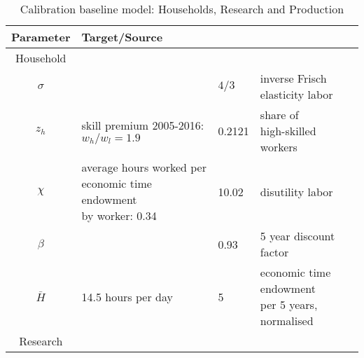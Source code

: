  \begin{table}[h!]
 	\begin{center}
 		\captionsetup{width=0.9\textwidth}
 		\caption{ Calibration baseline model: Households, Research and Production}
 		\label{tab:calib}
 		\begin{tabular}{c|lll}
 			\hline \hline
 			Parameter& Target/Source& \makecell[l]{Calibration}& \makecell[l]{Meaning}\\ 
 			\hline
 			\hline
 			Household&\multicolumn{3}{c}{}\\
 			\hline 
 			
 			\hline
 			$\sigma$ &  \makecell[l]{\cite{Chetty2011AreMargins}}& $4/3$ & inverse Frisch elasticity labor  \\
 			\hline
 			$z_h$& \makecell[l]{skill premium 2005-2016:\\ $w_h/w_l=1.9$\\ \citep{Slavik2020WagePremium}}&0.2121&\makecell[l]{share of\\ high-skilled workers} \\	
 			\hline			
 			$\chi$ &  \makecell[l]{average hours worked per\\ economic time endowment\\ by worker: 0.34 \cite{OECDHoursworked}}& 10.02 & disutility labor \\
 			\hline
 			$\beta$ &  \makecell[l]{\cite{Barrage2019OptimalPolicy}}& 0.93 & 5 year discount factor  \\
 			\hline
 			$\bar{H}$& \makecell[l]{14.5 hours per day\\ \cite{Jones1993OptimalGrowth}}&5&\makecell[l]{economic time endowment \\per 5 years, normalised} \\
 			\hline
 			\hline
 			Research&\multicolumn{3}{c}{}\\
 			\hline
 			

\end{tabular}
\end{center}
\end{table}
